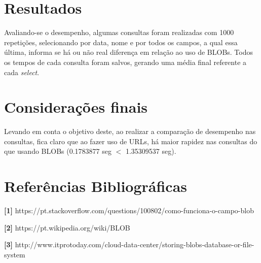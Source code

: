 \documentclass[12pt,a4paper]{article}
\begin{document}


\section{Resultados}

Avaliando-se o desempenho, algumas consultas foram realizadas com 1000 repetições, selecionando por data, nome e por todos os campos, a qual essa última, informa se há ou não real diferença em relação ao uso de BLOBs. Todos os tempos de cada consulta foram salvos, gerando uma média final referente a cada \textit{select}. \\\vspace{0.1cm}













\section{Considerações finais}
Levando em conta o objetivo deste, ao realizar a comparação de desempenho nas consultas, fica claro que ao fazer uso de URLs, há maior rapidez nas consultas do que usando BLOBs (0.1783877 seg $<$ 1.35309537 seg).



\section{Referências Bibliográficas}
\noindent \textbf{[1]} {https://pt.stackoverflow.com/questions/100802/como-funciona-o-campo-blob}\\\vspace{0.2cm}

\noindent \textbf{[2]} {https://pt.wikipedia.org/wiki/BLOB}\\\vspace{0.2cm}

\noindent \textbf{[3]} {http://www.itprotoday.com/cloud-data-center/storing-blobs-database-or-file-system}\\\vspace{0.2cm}
\end{document}
